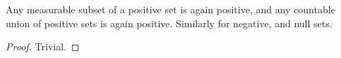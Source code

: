 \documentclass[../../main.tex]{subfiles}
\begin{document}
\begin{wts}
    Any measurable subset of a positive set is again positive, and any countable union of positive sets is again positive. Similarly for negative, and null sets.
\end{wts}
\begin{proof}
    Trivial.
\end{proof}
\end{document}
